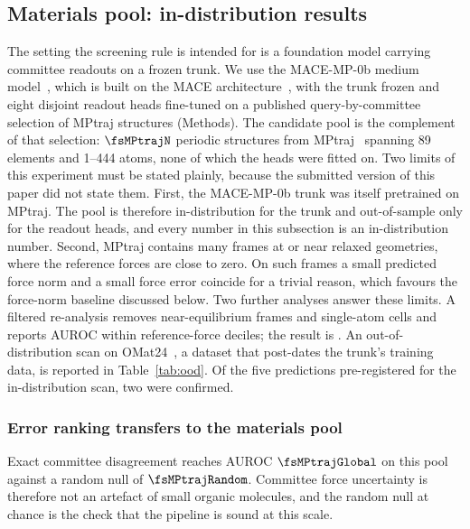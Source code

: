 \subsection{Materials pool: in-distribution results}
\label{sec:materials_id}

The setting the screening rule is intended for is a foundation model carrying
committee readouts on a frozen trunk. We use the MACE-MP-0b medium
model~\citep{batatia2023foundation}, which is built on the MACE
architecture~\citep{batatia2022mace}, with the trunk frozen and eight disjoint
readout heads fine-tuned on a published query-by-committee selection of MPtraj
structures (Methods). The candidate pool is the complement of that selection:
$\fsMPtrajN$ periodic structures from MPtraj~\citep{deng2023chgnet} spanning 89
elements and 1--444 atoms, none of which the heads were fitted on. Two limits
of this experiment must be stated plainly, because the submitted version of
this paper did not state them. First, the MACE-MP-0b trunk was itself
pretrained on MPtraj. The pool is therefore in-distribution for the trunk and
out-of-sample only for the readout heads, and every number in this subsection
is an in-distribution number. Second, MPtraj contains many frames at or near
relaxed geometries, where the reference forces are close to zero. On such
frames a small predicted force norm and a small force error coincide for a
trivial reason, which favours the force-norm baseline discussed below. Two
further analyses answer these limits. A filtered re-analysis removes
near-equilibrium frames and single-atom cells and reports AUROC within
reference-force deciles; the result is . An
out-of-distribution scan on OMat24~\citep{barrosoluque2024omat24}, a dataset
that post-dates the trunk's training data, is reported in
Table~\ref{tab:ood}. Of the five predictions pre-registered for the
in-distribution scan, two were confirmed.

\subsubsection{Error ranking transfers to the materials pool}

Exact committee disagreement reaches AUROC $\fsMPtrajGlobal$ on this pool
against a random null of $\fsMPtrajRandom$. Committee force uncertainty is
therefore not an artefact of small organic molecules, and the random null at
chance is the check that the pipeline is sound at this scale.

